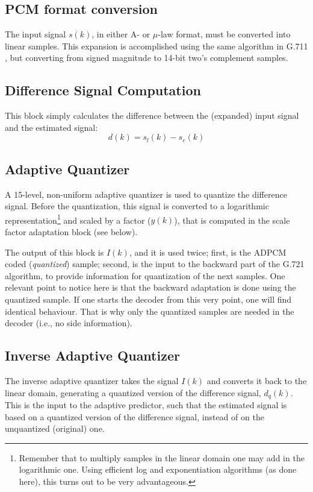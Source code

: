 \subsection{PCM format conversion}

The input signal $s(k)$, in either A- or $\mu$-law format, must be
converted into linear samples. This expansion is accomplished using the
same algorithm in G.711 \cite{G.711}, but converting from signed
magnitude to 14-bit two's complement samples.


\subsection{Difference Signal Computation}

This block simply calculates the difference between the (expanded) input signal and the estimated signal:
\[
      d(k) = s_l(k) - s_e(k)
\]


\subsection{Adaptive Quantizer}

A 15-level, non-uniform adaptive quantizer is used to quantize the
difference signal. Before the quantization, this signal is converted to
a logarithmic representation\footnote{\SF Remember that to multiply
samples in the linear domain one may add in the logarithmic one. Using
efficient log and exponentiation algorithms (as done here), this turns
out to be very advantageous.} and scaled by a factor ($y(k)$), that is
computed in the scale factor adaptation block (see below).

The output of this block is $I(k)$, and it is used twice; first, is
the ADPCM coded ({\em quantized}) sample; second, is the input to the
backward part of the G.721 algorithm, to provide information for
quantization of the next samples. One relevant point to notice here
is that the backward adaptation is done using the quantized sample.
If one starts the decoder from this very point, one will find
identical behaviour. That is why only the  quantized samples are
needed in the decoder (i.e., no side information).


\subsection{Inverse Adaptive Quantizer}

The inverse adaptive quantizer takes the signal $I(k)$ and converts it
back to the linear domain, generating a quantized version of the
difference signal, $d_q(k)$. This is the input to the adaptive
predictor, such that the estimated signal is based on a quantized
version of the difference signal, instead of on the unquantized
(original) one.


